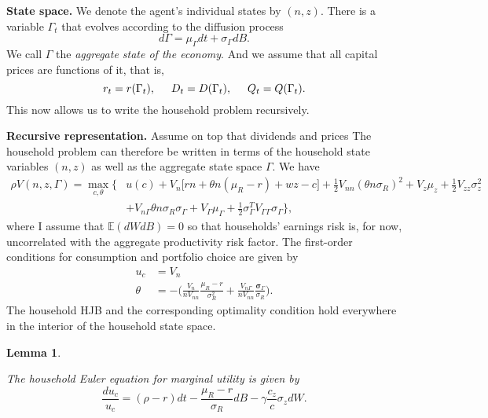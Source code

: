 \documentclass[11pt]{extarticle}
\theoremstyle{plain}
\newtheorem{lem}[thm]{Lemma}
\theoremstyle{definition}
\begin{document}
\vspace{5mm}
\noindent
\textbf{State space.} We denote the agent's individual states by $(n, z)$. There is a variable $\Gamma_t$ that evolves according to the diffusion process 
\begin{equation*}
	d \Gamma = \mu_\Gamma dt + \sigma_\Gamma dB.
\end{equation*}
We call $\Gamma$ the \textit{aggregate state of the economy}. And we assume that all capital prices are functions of it, that is, 
\begin{equation*}
	r_t = r(\Gamma_t), \hspace{5mm}	D_t = D(\Gamma_t), \hspace{5mm}	Q_t = Q(\Gamma_t).
\end{equation*}
This now allows us to write the household problem recursively.


\vspace{5mm}
\noindent
\textbf{Recursive representation.} Assume on top that dividends and prices 
The household problem can therefore be written in terms of the household state variables $(n,z)$ as well as the aggregate state space $\Gamma$. We have
\begin{align*}
	\rho V(n,z,\Gamma) = \max_{c,\theta} \bigg\{  & u(c) + V_n \Big[ rn + \theta n (\mu_R - r) + wz - c \Big] + \frac{1}{2} V_{nn} (\theta n \sigma_R)^2 +  V_z \mu_z + \frac{1}{2} V_{zz} \sigma_z^2  \\
	& + V_{n \Gamma} \theta n \sigma_R \sigma_\Gamma + V_\Gamma \mu_\Gamma + \frac{1}{2} \sigma_\Gamma^T V_{\Gamma \Gamma} \sigma_\Gamma \bigg\},
\end{align*}
where I assume that $\mathbb{E}(dW dB) = 0$ so that households' earnings risk is, for now, uncorrelated with the aggregate productivity risk factor. The first-order conditions for consumption and portfolio choice are given by
\begin{align*}
	u_c &= V_n \\
	\theta  &= - \bigg( \frac{V_n}{n V_{nn} } \frac{\mu_R - r}{\sigma_R^2 } + \frac{V_{n \Gamma} }{n V_{nn} } \frac{ \bm \sigma_\Gamma }{\sigma_R} \bigg).
\end{align*}
The household HJB and the corresponding optimality condition hold everywhere in the interior of the household state space. 


\begin{lem}\label{lem:MUEuler}
	
	The household Euler equation for marginal utility is given by
	\begin{equation*}
		\frac{d u_c}{u_c} = (\rho - r) dt -  \frac{\mu_R - r}{\sigma_R} dB  - \gamma \frac{c_z}{c} \sigma_z dW .
	\end{equation*}
	
\end{lem}
\end{document}
